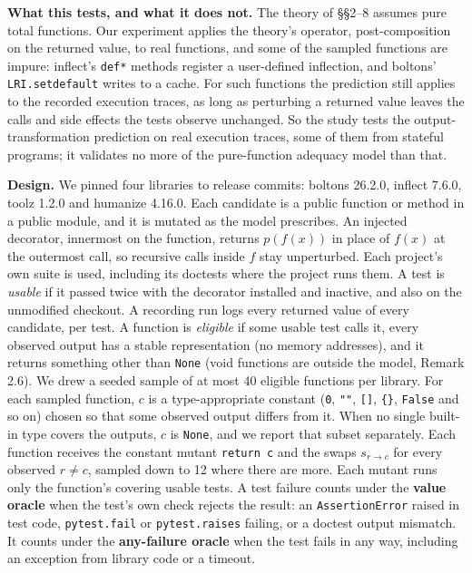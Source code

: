 \documentclass[conference]{IEEEtran}
\theoremstyle{run}
\begin{document}
\textbf{What this tests, and what it does not.} The theory of \S \S 2--8 assumes pure total functions. Our experiment applies the theory's operator, post-composition on the returned value, to real functions, and some of the sampled functions are impure: inflect's \texttt{def*} methods register a user-defined inflection, and boltons' \texttt{LRI.setdefault} writes to a cache. For such functions the prediction still applies to the recorded execution traces, as long as perturbing a returned value leaves the calls and side effects the tests observe unchanged. So the study tests the output-transformation prediction on real execution traces, some of them from stateful programs; it validates no more of the pure-function adequacy model than that.

\textbf{Design.} We pinned four libraries to release commits: boltons 26.2.0, inflect 7.6.0, toolz 1.2.0 and humanize 4.16.0. Each candidate is a public function or method in a public module, and it is mutated as the model prescribes. An injected decorator, innermost on the function, returns $p(f(x))$ in place of $f(x)$ at the outermost call, so recursive calls inside $f$ stay unperturbed. Each project's own suite is used, including its doctests where the project runs them. A test is \emph{usable} if it passed twice with the decorator installed and inactive, and also on the unmodified checkout. A recording run logs every returned value of every candidate, per test. A function is \emph{eligible} if some usable test calls it, every observed output has a stable representation (no memory addresses), and it returns something other than \texttt{None} (void functions are outside the model, Remark 2.6). We drew a seeded sample of at most 40 eligible functions per library. For each sampled function, $c$ is a type-appropriate constant (\texttt{0}, \texttt{""}, \texttt{[]}, \texttt{\{\}}, \texttt{False} and so on) chosen so that some observed output differs from it. When no single built-in type covers the outputs, $c$ is \texttt{None}, and we report that subset separately. Each function receives the constant mutant \texttt{return c} and the swaps $s_{r \to c}$ for every observed $r \neq c$, sampled down to 12 where there are more. Each mutant runs only the function's covering usable tests. A test failure counts under the \textbf{value oracle} when the test's own check rejects the result: an \texttt{AssertionError} raised in test code, \texttt{pytest.fail} or \texttt{pytest.raises} failing, or a doctest output mismatch. It counts under the \textbf{any-failure oracle} when the test fails in any way, including an exception from library code or a timeout.
\end{document}
